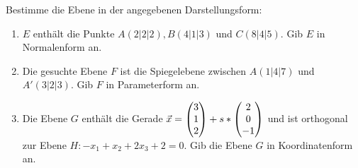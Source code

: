 Bestimme die Ebene in der angegebenen Darstellungsform:
\begin{enumerate}
	\item $E$ enthält die Punkte $A(2|2|2), B(4|1|3)$ und $C(8|4|5)$. Gib $E$ in Normalenform an. %
	\item Die gesuchte Ebene $F$ ist die Spiegelebene zwischen $A(1|4|7)$ und $A'(3|2|3)$. Gib $F$ in Parameterform an. %
	\item Die Ebene $G$ enthält die Gerade $\vec x = \begin{pmatrix} 3\\1\\2 \end{pmatrix}+s*\begin{pmatrix} 2\\0\\-1 \end{pmatrix}$ und ist orthogonal zur Ebene $H:-x_1+x_2+2x_3+2=0$. Gib die Ebene $G$ in Koordinatenform an. %
\end{enumerate}
